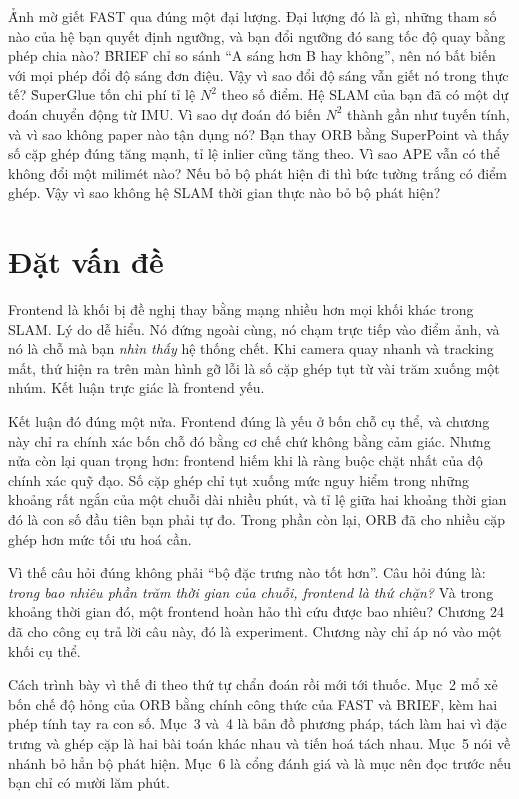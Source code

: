 \documentclass[../../deep_learning.tex]{subfiles}
\begin{document}
\begin{khoigoi}
\h{Ảnh mờ giết FAST qua đúng một đại lượng. Đại lượng đó là gì, những tham số nào của hệ bạn quyết định ngưỡng, và bạn đổi ngưỡng đó sang tốc độ quay bằng phép chia nào?}
\h{BRIEF chỉ so sánh ``A sáng hơn B hay không'', nên nó bất biến với mọi phép đổi độ sáng đơn điệu. Vậy vì sao đổi độ sáng vẫn giết nó trong thực tế?}
\h{SuperGlue tốn chi phí tỉ lệ \(N^2\) theo số điểm. Hệ SLAM của bạn đã có một dự đoán chuyển động từ IMU. Vì sao dự đoán đó biến \(N^2\) thành gần như tuyến tính, và vì sao không paper nào tận dụng nó?}
\h{Bạn thay ORB bằng SuperPoint và thấy số cặp ghép đúng tăng mạnh, tỉ lệ inlier cũng tăng theo. Vì sao APE vẫn có thể không đổi một milimét nào?}
\h{Nếu bỏ bộ phát hiện đi thì bức tường trắng có điểm ghép. Vậy vì sao không hệ SLAM thời gian thực nào bỏ bộ phát hiện?}
\end{khoigoi}

\section{Đặt vấn đề}
Frontend là khối bị đề nghị thay bằng mạng nhiều hơn mọi khối khác trong SLAM. Lý do dễ hiểu. Nó đứng ngoài cùng, nó chạm trực tiếp vào điểm ảnh, và nó là chỗ mà bạn \emph{nhìn thấy} hệ thống chết. Khi camera quay nhanh và tracking mất, thứ hiện ra trên màn hình gỡ lỗi là số cặp ghép tụt từ vài trăm xuống một nhúm. Kết luận trực giác là frontend yếu.

Kết luận đó đúng một nửa. Frontend đúng là yếu ở bốn chỗ cụ thể, và chương này chỉ ra chính xác bốn chỗ đó bằng cơ chế chứ không bằng cảm giác. Nhưng nửa còn lại quan trọng hơn: frontend hiếm khi là ràng buộc chặt nhất của độ chính xác quỹ đạo. Số cặp ghép chỉ tụt xuống mức nguy hiểm trong những khoảng rất ngắn của một chuỗi dài nhiều phút, và tỉ lệ giữa hai khoảng thời gian đó là con số đầu tiên bạn phải tự đo. Trong phần còn lại, ORB đã cho nhiều cặp ghép hơn mức tối ưu hoá cần.

Vì thế câu hỏi đúng không phải ``bộ đặc trưng nào tốt hơn''. Câu hỏi đúng là: \emph{trong bao nhiêu phần trăm thời gian của chuỗi, frontend là thứ chặn?} Và trong khoảng thời gian đó, một frontend hoàn hảo thì cứu được bao nhiêu? Chương 24 đã cho công cụ trả lời câu này, đó là  experiment. Chương này chỉ áp nó vào một khối cụ thể.

Cách trình bày vì thế đi theo thứ tự chẩn đoán rồi mới tới thuốc. Mục~2 mổ xẻ bốn chế độ hỏng của ORB bằng chính công thức của FAST và BRIEF, kèm hai phép tính tay ra con số. Mục~3 và~4 là bản đồ phương pháp, tách làm hai vì đặc trưng và ghép cặp là hai bài toán khác nhau và tiến hoá tách nhau. Mục~5 nói về nhánh bỏ hẳn bộ phát hiện. Mục~6 là cổng đánh giá và là mục nên đọc trước nếu bạn chỉ có mười lăm phút.
\end{document}

